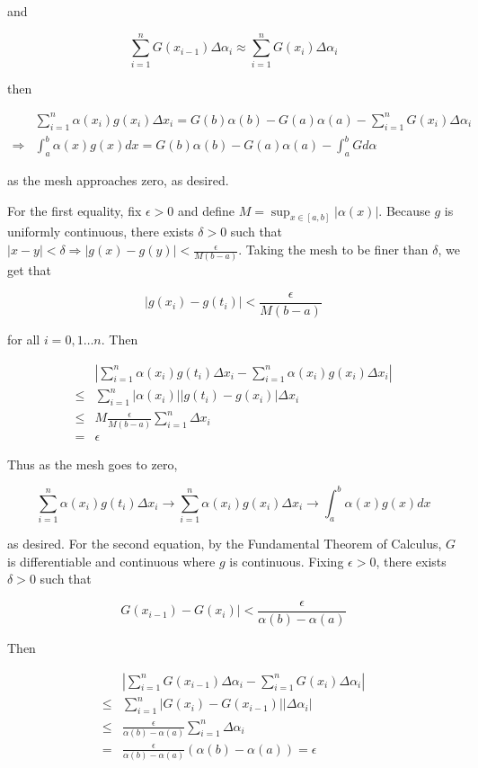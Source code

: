\documentclass{article}
\begin{document}
and

\[
\sum_{i=1}^n G(x_{i-1}) \Delta \alpha_i \approx \sum_{i=1}^n G(x_i) \Delta \alpha_i
\]

then

\begin{align*}
&\sum_{i=1}^n \alpha(x_i) g(x_i) \Delta x_i = G(b)\alpha(b) - G(a) \alpha(a) - \sum_{i=1}^n G(x_i) \Delta \alpha_i \\
\Longrightarrow &\int_a^b \alpha(x) g(x) dx = G(b)\alpha(b) - G(a)\alpha(a) - \int_a^bGd\alpha
\end{align*}

as the mesh approaches zero, as desired.

For the first equality, fix $\epsilon > 0$ and define $M = \sup_{x \in [a, b]} |\alpha(x)|$. Because $g$ is uniformly continuous, there exists $\delta > 0$ such that $|x-y| < \delta \Longrightarrow |g(x) - g(y)| < \frac{\epsilon}{M(b-a)}$. Taking the mesh to be finer than $\delta$, we get that

\[
|g(x_i) - g(t_i)| < \frac{\epsilon}{M(b-a)}
\]

for all $i = 0, 1 \dots n$. Then

\begin{align*}
&|\sum_{i=1}^n \alpha(x_i) g(t_i) \Delta x_i - \sum_{i=1}^n \alpha(x_i) g(x_i) \Delta x_i| \\
\leq& \sum_{i=1}^n |\alpha(x_i)| |g(t_i)-g(x_i)| \Delta x_i \\
\leq& M \frac{\epsilon}{M(b-a) }\sum_{i=1}^n \Delta x_i \\
=& \epsilon
\end{align*}

Thus as the mesh goes to zero,

\[\sum_{i=1}^n \alpha(x_i) g(t_i) \Delta x_i \rightarrow \sum_{i=1}^n \alpha(x_i) g(x_i) \Delta x_i \rightarrow \int_a^b \alpha(x) g(x) dx
\]

as desired. For the second equation, by the Fundamental Theorem of Calculus, $G$ is differentiable and continuous where $g$ is continuous. Fixing $\epsilon > 0$, there exists $\delta > 0$ such that

\[
G(x_{i-1}) - G(x_i)| < \frac{\epsilon}{\alpha(b) - \alpha(a)}
\]

Then

\begin{align*}
&|\sum_{i=1}^n G(x_{i-1}) \Delta \alpha_i - \sum_{i=1}^n G(x_i) \Delta \alpha_i| \\
\leq& \sum_{i=1}^n |G(x_i) - G(x_{i-1})| |\Delta \alpha_i| \\
\leq& \frac{\epsilon}{\alpha(b) - \alpha(a)} \sum_{i=1}^n \Delta \alpha_i \\
=& \frac{\epsilon}{\alpha(b) - \alpha(a)} (\alpha(b) - \alpha(a)) = \epsilon
\end{align*}
\end{document}
